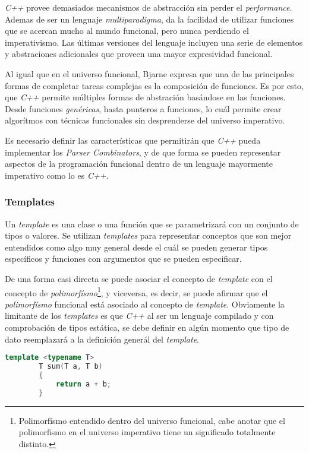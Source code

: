 	\emph{C++} provee demasiados mecanismos de abstracción sin perder el \emph{performance}. Ademas de ser un lenguaje \emph{multiparadigma}, da la facilidad de utilizar funciones que se acercan mucho al mundo funcional, pero nunca perdiendo el imperativismo. Las últimas versiones del lenguaje incluyen una serie de elementos y abstraciones adicionales que proveen una mayor expresividad funcional.
	
	Al igual que en el universo funcional, Bjarne expresa que una de las principales formas de completar tareas complejas es la composición de funciones. Es por esto, que \emph{C++} permite múltiples formas de abstración basándose en las funciones. Desde funciones \emph{genéricas}, hasta punteros a funciones, lo cuál permite crear algorítmos con técnicas funcionales sin desprenderse del universo imperativo. 
	
	Es necesario definir las características que permitirán que \emph{C++} pueda implementar los \emph{Parser Combinators}, y de que forma se pueden representar aspectos de la programación funcional dentro de un lenguaje mayormente imperativo como lo es \emph{C++}.
	
	\subsubsection{Templates}
		Un \emph{template} es una clase o una función que se parametrizará con un conjunto de tipos o valores. Se utilizan \emph{templates} para representar conceptos que son mejor entendidos como algo muy general desde el cuál se pueden generar tipos específicos y funciones con argumentos que se pueden especificar. \cite{Bjarne2013}
		
		De una forma casi directa se puede asociar el concepto de \emph{template} con el concepto de \emph{polimorfísmo}\footnote{Polimorfísmo entendido dentro del universo funcional, cabe anotar que el polimorfismo en el universo imperativo tiene un significado totalmente distinto.}, y viceversa, es decir, se puede afirmar que el \emph{polimorfísmo} funcional está asociado al concepto de \emph{template}. Obviamente la limitante de los \emph{templates} es que \emph{C++} al ser un lenguaje compilado y con comprobación de tipos estática, se debe definir en algún momento que tipo de dato reemplazará a la definición generál del \emph{template}.
		
		\begin{lstlisting}[language=C++, caption="Función que suma dos variables de tipo T"]
		template <typename T>
		T sum(T a, T b)
		{
			return a + b;
		}
		\end{lstlisting}
		
